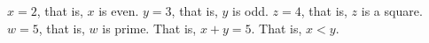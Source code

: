 $x = 2$, that is, $x$ is even.
$y = 3$, that is, $y$ is odd.
$z = 4$, that is, $z$ is a square.
$w = 5$, that is, $w$ is prime.
That is, $x + y = 5$.
That is, $x < y$.